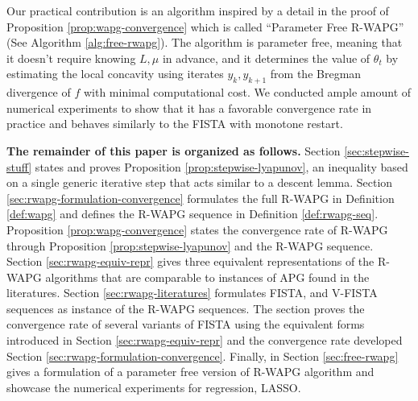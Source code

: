 \documentclass[12pt]{article}
\begin{document}
        Our practical contribution is an algorithm inspired by a detail in the proof of Proposition \ref{prop:wapg-convergence} which is called ``Parameter Free R-WAPG'' (See Algorithm \ref{alg:free-rwapg}). 
        The algorithm is parameter free, meaning that it doesn't require knowing $L, \mu$ in advance, and it determines the value of $\theta_t$ by estimating the local concavity using iterates $y_{k}, y_{k + 1}$ from the Bregman divergence of $f$ with minimal computational cost. 
        We conducted ample amount of numerical experiments to show that it has a favorable convergence rate in practice and behaves similarly to the FISTA with monotone restart.
        \par
        \textbf{The remainder of this paper is organized as follows. }
        Section \ref{sec:stepwise-stuff} states and proves Proposition \ref{prop:stepwise-lyapunov}, an inequality based on a single generic iterative step that acts similar to a descent lemma. 
        Section \ref{sec:rwapg-formulation-convergence} formulates the full R-WAPG in Definition \ref{def:wapg} and defines the R-WAPG sequence in Definition \ref{def:rwapg-seq}. 
        Proposition \ref{prop:wapg-convergence} states the convergence rate of R-WAPG through Proposition \ref{prop:stepwise-lyapunov} and the R-WAPG sequence. 
        Section \ref{sec:rwapg-equiv-repr} gives three equivalent representations of the R-WAPG algorithms that are comparable to instances of APG found in the literatures. 
        Section \ref{sec:rwapg-literatures} formulates FISTA, and V-FISTA sequences as instance of the R-WAPG sequences.
        The section proves the convergence rate of several variants of FISTA using the equivalent forms introduced in Section \ref{sec:rwapg-equiv-repr} and the convergence rate developed Section \ref{sec:rwapg-formulation-convergence}. 
        Finally, in Section \ref{sec:free-rwapg} gives a formulation of a parameter free version of R-WAPG algorithm and showcase the numerical experiments for regression, LASSO. 
\end{document}

